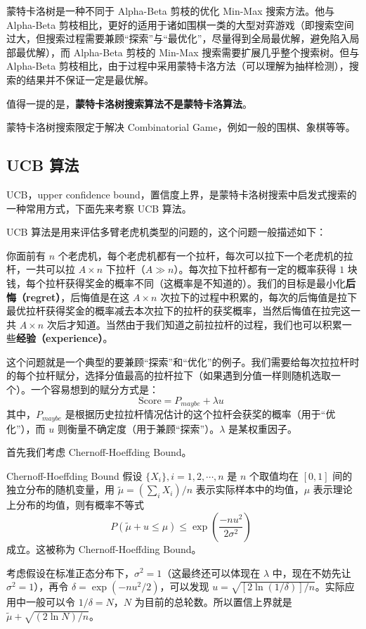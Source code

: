 


蒙特卡洛树是一种不同于 Alpha-Beta 剪枝的优化 Min-Max 搜索方法。他与 Alpha-Beta 剪枝相比，更好的适用于诸如围棋一类的大型对弈游戏（即搜索空间过大，但搜索过程需要兼顾“探索”与“最优化”，尽量得到全局最优解，避免陷入局部最优解），而 Alpha-Beta 剪枝的 Min-Max 搜索需要扩展几乎整个搜索树。但与 Alpha-Beta 剪枝相比，由于过程中采用蒙特卡洛方法（可以理解为抽样检测），搜索的结果并不保证一定是最优解。

值得一提的是，\textbf{蒙特卡洛树搜索算法不是蒙特卡洛算法}。

蒙特卡洛树搜索限定于解决 Combinatorial Game，例如一般的围棋、象棋等等。

\subsection{UCB 算法}
UCB，upper confidence bound，置信度上界，是蒙特卡洛树搜索中启发式搜索的一种常用方式，下面先来考察 UCB 算法。





UCB 算法是用来评估多臂老虎机类型的问题的，这个问题一般描述如下：

你面前有 $n$ 个老虎机，每个老虎机都有一个拉杆，每次可以拉下一个老虎机的拉杆，一共可以拉 $A\times n$ 下拉杆（$A \gg n$）。每次拉下拉杆都有一定的概率获得 $1$ 块钱，每个拉杆获得奖金的概率不同（这概率是不知道的）。我们的目标是最小化\textbf{后悔（regret）}，后悔值是在这 $A\times n$ 次拉下的过程中积累的，每次的后悔值是拉下最优拉杆获得奖金的概率减去本次拉下的拉杆的获奖概率，当然后悔值在拉完这一共 $A\times n$ 次后才知道。当然由于我们知道之前拉拉杆的过程，我们也可以积累一些\textbf{经验（experience）}。

这个问题就是一个典型的要兼顾“探索”和“优化”的例子。我们需要给每次拉拉杆时的每个拉杆赋分，选择分值最高的拉杆拉下（如果遇到分值一样则随机选取一个）。一个容易想到的赋分方式是：
$$\text{Score} = P_{maybe} + \lambda u ~~$$
其中，$P_{maybe}$ 是根据历史拉拉杆情况估计的这个拉杆会获奖的概率（用于“优化”），而 $u$ 则衡量不确定度（用于兼顾“探索”）。$\lambda$ 是某权重因子。

首先我们考虑 Chernoff-Hoeffding Bound。
\begin{theorem}{Chernoff-Hoeffding Bound}
假设 $\{X_i\}, i=1, 2, \cdots, n$ 是 $n$ 个取值均在 $[0, 1]$ 间的独立分布的随机变量，用 $\widetilde \mu = \left(\sum_{i} X_i\right)/n$ 表示实际样本中的均值，$\mu$ 表示理论上分布的均值，则有概率不等式
$$P\left(\widetilde \mu + u \le \mu\right) \le \exp\left(\frac{-n u^2}{2 \sigma^2}\right) ~~$$
成立。这被称为 Chernoff-Hoeffding Bound。
\end{theorem}
考虑假设在标准正态分布下，$\sigma^2=1$（这最终还可以体现在 $\lambda$ 中，现在不妨先让 $\sigma^2=1$），再令 $\delta = \exp\left(-nu^2/2\right)$，可以发现 $u=\sqrt{[2 \ln(1/\delta)]/n}$。实际应用中一般可以令 $1/\delta=N$，$N$ 为目前的总轮数。所以置信上界就是 $\widetilde \mu + \sqrt{\left(2 \ln N \right)/n}$。

